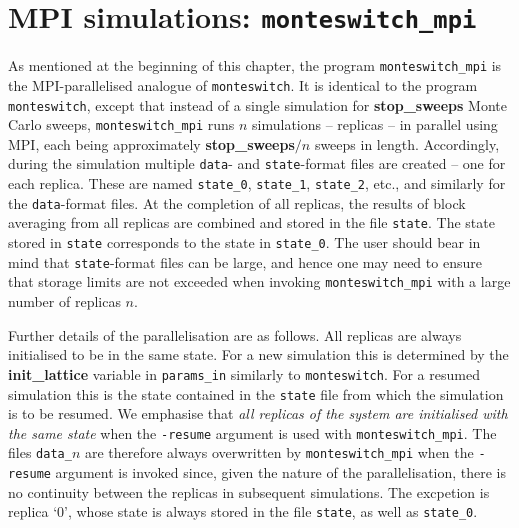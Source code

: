 \documentclass{report}
\begin{document}
\section{MPI simulations: \texttt{monteswitch\_mpi}}\label{sec:monteswitch_mpi}
As mentioned at the beginning of this chapter, the program \texttt{monteswitch\_mpi} is the MPI-parallelised analogue of \texttt{monteswitch}. 
It is identical to the program \texttt{monteswitch}, except that instead of a single simulation for \textbf{stop\_sweeps} Monte Carlo sweeps, 
\texttt{monteswitch\_mpi} runs $n$ simulations -- replicas -- in parallel using MPI, each being approximately \textbf{stop\_sweeps}$/n$ sweeps in 
length. Accordingly, during the simulation multiple \texttt{data}- and \texttt{state}-format files are created -- one for each replica. These 
are named \texttt{state\_0}, \texttt{state\_1}, \texttt{state\_2}, etc., and similarly for the \texttt{data}-format files. At the completion of 
all replicas, the results of block averaging from all replicas are combined and stored in the file \texttt{state}. The state stored in \texttt{state}
corresponds to the state in \texttt{state\_0}. 
The user should bear in mind that \texttt{state}-format files can be large, and hence one may need to ensure that storage limits are not exceeded when
invoking \texttt{monteswitch\_mpi} with a large number of replicas $n$.

Further details of the parallelisation are as follows. All replicas are always initialised to be in the same state. For a new simulation this is 
determined by the \textbf{init\_lattice} variable in \texttt{params\_in} similarly to \texttt{monteswitch}. For a resumed simulation this is the state 
contained in the \texttt{state} file from which the simulation is to be resumed. We emphasise that \emph{all replicas of the system are initialised with 
the same state} when the \texttt{-resume} argument is used with \texttt{monteswitch\_mpi}. 
The files \texttt{data\_}$n$ are therefore always overwritten by \texttt{monteswitch\_mpi} when the \texttt{-resume} argument is
invoked since, given the nature of the parallelisation, there is no continuity between the replicas in subsequent simulations. The excpetion is replica `0',
whose state is always stored in the file \texttt{state}, as well as \texttt{state\_0}.
\end{document}
